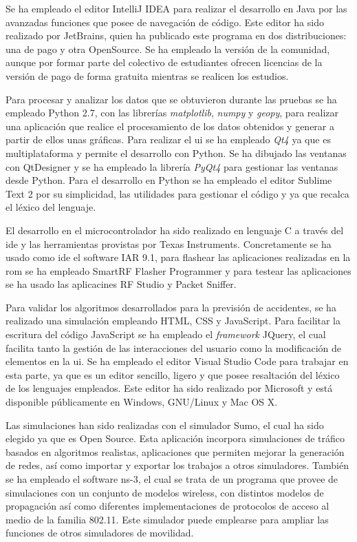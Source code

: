 Se ha empleado el editor IntelliJ IDEA para realizar el desarrollo en Java por
las avanzadas funciones que posee de navegación de código. Este editor ha sido
realizado por JetBrains, quien ha publicado este programa en dos distribuciones:
una de pago y otra OpenSource. Se ha empleado la versión de la comunidad,
aunque por formar parte del colectivo de estudiantes ofrecen licencias de la
versión de pago de forma gratuita mientras se realicen los estudios.

Para procesar y analizar los datos que se obtuvieron durante las pruebas se ha
empleado Python 2.7, con las librerías \emph{matplotlib}, \emph{numpy} y
\emph{geopy}, para realizar una aplicación que realice el procesamiento de
los datos obtenidos y generar a partir de ellos unas gráficas. Para realizar
el \gls{ui} se ha empleado \emph{Qt4} ya que es multiplataforma y permite
el desarrollo con Python. Se ha dibujado las ventanas con QtDesigner y se ha
empleado la librería \emph{PyQt4} para gestionar las ventanas desde Python.
Para el desarrollo en Python se ha empleado el editor Sublime Text 2 por su
simplicidad, las utilidades para gestionar el código y ya que recalca el léxico
del lenguaje.

El desarrollo en el microcontrolador ha sido realizado en lenguaje C a través
del \gls{ide} y las herramientas provistas por Texas Instruments. Concretamente
se ha usado como \gls{ide} el software IAR 9.1, para flashear las aplicaciones
realizadas en la \gls{rom} se ha empleado SmartRF Flasher Programmer y para
testear las aplicaciones se ha usado las aplicacines RF Studio y Packet Sniffer.

Para validar los algoritmos desarrollados para la previsión de accidentes, se
ha realizado una simulación empleando HTML, CSS y JavaScript. Para facilitar
la escritura del código JavaScript se ha empleado el \emph{framework} JQuery,
el cual facilita tanto la gestión de las interacciones del usuario como la
modificación de elementos en la \gls{ui}. Se ha empleado el editor Visual
Studio Code para trabajar en esta parte, ya que es un editor sencillo, ligero
y que posee resaltación del léxico de los lenguajes empleados. Este editor ha
sido realizado por Microsoft y está disponible públicamente en Windows,
GNU/Linux y Mac OS X.

Las simulaciones han sido realizadas con el simulador Sumo, el cual ha sido
elegido ya que es Open Source. Esta aplicación incorpora simulaciones de
tráfico basados en algoritmos realistas, aplicaciones que permiten mejorar la
generación de redes, así como importar y exportar los trabajos a otros
simuladores. También se ha empleado el software ns-3, el cual se trata de un
programa que provee de simulaciones con un conjunto de modelos wireless, con
distintos modelos de propagación así como diferentes implementaciones de
protocolos de acceso al medio de la familia 802.11. Este simulador
puede emplearse para ampliar las funciones de otros simuladores de movilidad.

